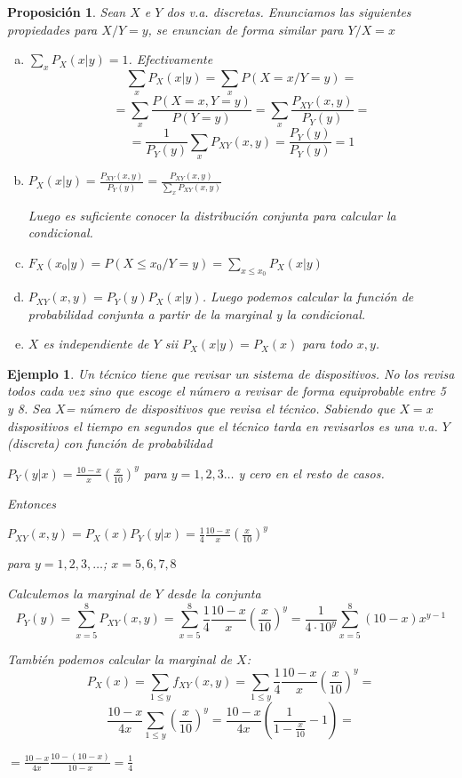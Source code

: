 \documentclass[12pt]{report}
\newtheorem{proposition}[definition]{Proposici\'on}
\newtheorem{example}[definition]{Ejemplo}
\begin{document}
    \begin{proposition}
      Sean $X$ e $Y$ dos v.a. discretas.
      Enunciamos las siguientes propiedades para $X/Y=y$,
      se enuncian de
      forma similar para $Y/X=x$
 \begin{enumerate}[a)]
        \item$\sum_{x} P_{X}(x|y)=1$. Efectivamente
          $$\sum_{x} P_{X}(x|y)=\sum_{x}
          P(X=x/Y=y)=$$
          $$=\sum_{x}\frac{P(X=x,Y=y)}{P(Y=y)}=
          \sum_{x}\frac{P_{XY}(x,y)}{P_{Y}(y)}=$$
          $$=\frac{1}{P_{Y}(y)}\sum_{x}P_{XY}(x,y)=
          \frac{P_{Y}(y)}{P_{Y}(y)}=1$$
    \item $P_{X}(x|y)=\frac{P_{XY}(x,y)}{P_{Y}(y)}=
          \frac{P_{XY}(x,y)}{\sum_{x}P_{XY}(x,y)}$

         Luego es suficiente conocer la distribución conjunta para
         calcular la condicional.
         \item $F_{X}(x_{0}|y)=P(X\leq x_{0}/Y=y)=\sum_{x\leq x_{0}}P_{X}(x|y)$

\item$P_{XY}(x,y)=P_{Y}(y) P_{X}(x|y)$. Luego podemos
         calcular la función de probabilidad conjunta a partir de la
         marginal y la condicional.

      \item $X$ es independiente de $Y$ sii
         $P_{X}(x|y)=P_{X}(x)$ para todo $x,y$.
\end{enumerate}
\end{proposition}

\begin{example}
 Un técnico tiene que revisar un sistema de dispositivos. No los revisa todos cada vez
sino que escoge el número a revisar de forma equiprobable entre 5 y 8. Sea $X$= número de
dispositivos que revisa el técnico. Sabiendo que $X=x$ dispositivos el tiempo en segundos
que el técnico tarda en revisarlos es una v.a. $Y$ (discreta) con función de probabilidad

$P_{Y}(y|x)=\frac{10-x}{x} \left(\frac{x}{10}\right)^y$ para $y=1,2,3\ldots$ y cero en el
resto de casos.

Entonces

$P_{XY}(x,y)=P_{X}(x) P_{Y}(y|x)=\frac{1}{4}\frac{10-x}{x} \left(\frac{x}{10}\right)^y$

para $y=1,2,3,\ldots$; $x=5,6,7,8$

Calculemos la marginal de $Y$ desde la conjunta $$P_{Y}(y)=\sum_{x=5}^{8}
P_{XY}(x,y)=\sum_{x=5}^{8} \frac{1}{4}\frac{10-x}{x}
\left(\frac{x}{10}\right)^y=\frac{1}{4\cdot10^{y}}\sum_{x=5}^{8} (10-x) x^{y-1}$$


También podemos calcular la marginal de $X$:
$$ P_{X}(x)=\sum_{1\leq y}f_{XY}(x,y)=
\sum_{1\leq y} \frac{1}{4} \frac{10-x}{x} \left(\frac{x}{10}\right)^y=$$
$$\frac{10-x}{4x}
\sum_{1\leq
y}\left(\frac{x}{10}\right)^{y}=\frac{10-x}{4x}\left(\frac{1}{1-\frac{x}{10}}-1\right)=$$

$\displaystyle{=\frac{10-x}{4x}\frac{10-(10-x)}{10-x}=\frac{1}{4}}$
\end{example}
\end{document}
